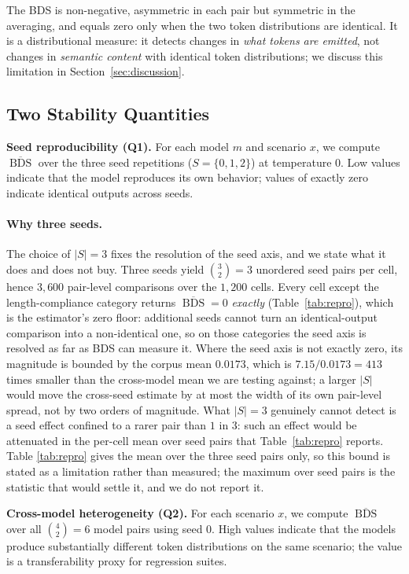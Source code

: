 \documentclass[11pt]{article}
\DeclareMathOperator{\BDS}{BDS}
\begin{document}
The BDS is non-negative, asymmetric in each pair but symmetric in the
averaging, and equals zero only when the two token distributions are
identical. It is a distributional measure: it detects changes in \emph{what
tokens are emitted}, not changes in \emph{semantic content} with identical
token distributions; we discuss this limitation in
Section~\ref{sec:discussion}.

\subsection{Two Stability Quantities}

\textbf{Seed reproducibility (Q1).} For each model $m$ and scenario $x$, we
compute $\overline{\BDS}$ over the three seed repetitions
($S = \{0,1,2\}$) at temperature 0. Low values indicate that the model
reproduces its own behavior; values of exactly zero indicate identical
outputs across seeds.

\paragraph{Why three seeds.} The choice of $|S| = 3$ fixes the resolution of
the seed axis, and we state what it does and does not buy. Three seeds yield
$\binom{3}{2} = 3$ unordered seed pairs per cell, hence $3{,}600$ pair-level
comparisons over the $1{,}200$ cells. Every cell except the length-compliance
category returns $\overline{\BDS} = 0$ \emph{exactly} (Table~\ref{tab:repro}),
which is the estimator's zero floor: additional seeds cannot turn an
identical-output comparison into a non-identical one, so on those categories
the seed axis is resolved as far as BDS can measure it. Where the seed axis is
not exactly zero, its magnitude is bounded by the corpus mean
$0.0173$, which is $7.15 / 0.0173 = 413$ times smaller than the cross-model
mean we are testing against; a larger $|S|$ would move the cross-seed estimate
by at most the width of its own pair-level spread, not by two orders of
magnitude. What $|S| = 3$ genuinely cannot detect is a seed effect confined to
a rarer pair than $1$ in $3$: such an effect would be attenuated in the
per-cell mean over seed pairs that Table~\ref{tab:repro} reports. Table
\ref{tab:repro} gives the mean over the three seed pairs only, so this bound is
stated as a limitation rather than measured; the maximum over seed pairs is the
statistic that would settle it, and we do not report it.


\textbf{Cross-model heterogeneity (Q2).} For each scenario $x$, we compute
$\overline{\BDS}$ over all $\binom{4}{2} = 6$ model pairs using seed 0.
High values indicate that the models produce substantially different token
distributions on the same scenario; the value is a transferability proxy
for regression suites.
\end{document}
